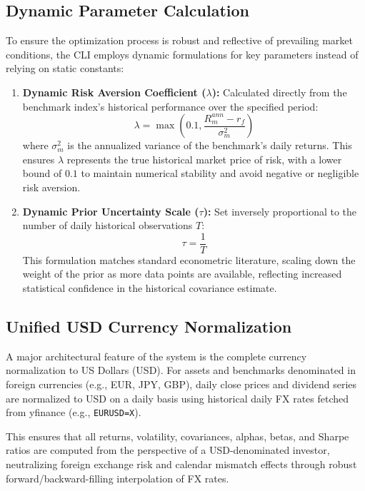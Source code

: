 \documentclass[11pt,a4paper]{article}
\begin{document}
\subsection{Dynamic Parameter Calculation}
To ensure the optimization process is robust and reflective of prevailing market conditions, the CLI employs dynamic formulations for key parameters instead of relying on static constants:
\begin{enumerate}
    \item \textbf{Dynamic Risk Aversion Coefficient ($\lambda$):} Calculated directly from the benchmark index's historical performance over the specified period:
    \begin{equation}
    \lambda = \max\left(0.1, \frac{R_m^{ann} - r_f}{\sigma_m^2}\right)
    \end{equation}
    where $\sigma_m^2$ is the annualized variance of the benchmark's daily returns. This ensures $\lambda$ represents the true historical market price of risk, with a lower bound of $0.1$ to maintain numerical stability and avoid negative or negligible risk aversion.
    
    \item \textbf{Dynamic Prior Uncertainty Scale ($\tau$):} Set inversely proportional to the number of daily historical observations $T$:
    \begin{equation}
    \tau = \frac{1}{T}
    \end{equation}
    This formulation matches standard econometric literature, scaling down the weight of the prior as more data points are available, reflecting increased statistical confidence in the historical covariance estimate.
\end{enumerate}

\subsection{Unified USD Currency Normalization}
A major architectural feature of the system is the complete currency normalization to US Dollars (USD). For assets and benchmarks denominated in foreign currencies (e.g., EUR, JPY, GBP), daily close prices and dividend series are normalized to USD on a daily basis using historical daily FX rates fetched from yfinance (e.g., \texttt{EURUSD=X}). 

This ensures that all returns, volatility, covariances, alphas, betas, and Sharpe ratios are computed from the perspective of a USD-denominated investor, neutralizing foreign exchange risk and calendar mismatch effects through robust forward/backward-filling interpolation of FX rates.
\end{document}
